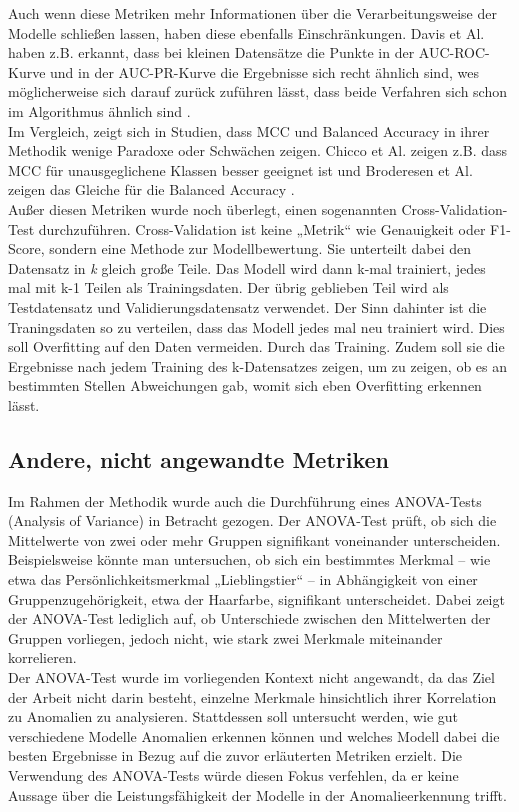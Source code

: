 \documentclass[a4paper,12pt]{article}
\begin{document}
	Auch wenn diese Metriken  mehr Informationen über die Verarbeitungsweise der Modelle schließen lassen, haben diese ebenfalls Einschränkungen. Davis et Al. haben z.B. erkannt, dass bei kleinen Datensätze die Punkte in der AUC-ROC-Kurve und in der AUC-PR-Kurve die Ergebnisse sich recht ähnlich sind, wes möglicherweise sich darauf zurück zuführen lässt, dass beide Verfahren sich schon im Algorithmus ähnlich sind \cite{davis2006relationship}.
	\\[0.5em]
	Im Vergleich, zeigt sich in Studien, dass MCC und Balanced Accuracy in ihrer Methodik wenige Paradoxe oder Schwächen zeigen. Chicco et Al. zeigen z.B. dass MCC für unausgeglichene Klassen besser geeignet ist und Broderesen et Al. zeigen das Gleiche für die Balanced Accuracy \cite{chicco2020advantages, brodersen2010balanced}.
	\\[0.5em]
	Außer diesen Metriken wurde noch überlegt, einen sogenannten Cross-Validation-Test durchzuführen. Cross-Validation ist keine „Metrik“ wie Genauigkeit oder F1-Score, sondern eine Methode zur Modellbewertung. Sie unterteilt dabei den Datensatz in \textit{k} gleich große Teile.  Das Modell wird dann k-mal trainiert, jedes mal mit k-1 Teilen als Trainingsdaten. Der übrig geblieben Teil wird als Testdatensatz und Validierungsdatensatz verwendet. Der Sinn dahinter ist die Traningsdaten so zu verteilen, dass das Modell jedes mal neu trainiert wird. Dies soll Overfitting auf den Daten vermeiden. Durch das Training. Zudem soll sie die Ergebnisse nach jedem Training des k-Datensatzes zeigen, um zu zeigen, ob es an bestimmten Stellen Abweichungen gab, womit sich eben Overfitting erkennen lässt.
	
	\subsection{Andere, nicht angewandte Metriken}
	Im Rahmen der Methodik wurde auch die Durchführung eines ANOVA-Tests (Analysis of Variance) in Betracht gezogen. Der ANOVA-Test prüft, ob sich die Mittelwerte von zwei oder mehr Gruppen signifikant voneinander unterscheiden. 
	\\[0.5em]
	Beispielsweise könnte man untersuchen, ob sich ein bestimmtes Merkmal – wie etwa das Persönlichkeitsmerkmal „Lieblingstier“ – in Abhängigkeit von einer Gruppenzugehörigkeit, etwa der Haarfarbe, signifikant unterscheidet. Dabei zeigt der ANOVA-Test lediglich auf, ob Unterschiede zwischen den Mittelwerten der Gruppen vorliegen, jedoch nicht, wie stark zwei Merkmale miteinander korrelieren.
	\\[0.5em]
	Der ANOVA-Test wurde im vorliegenden Kontext nicht angewandt, da das Ziel der Arbeit nicht darin besteht, einzelne Merkmale hinsichtlich ihrer Korrelation zu Anomalien zu analysieren. Stattdessen soll untersucht werden, wie gut verschiedene Modelle Anomalien erkennen können und welches Modell dabei die besten Ergebnisse in Bezug auf die zuvor erläuterten Metriken erzielt. Die Verwendung des ANOVA-Tests würde diesen Fokus verfehlen, da er keine Aussage über die Leistungsfähigkeit der Modelle in der Anomalieerkennung trifft.
	
\end{document}
